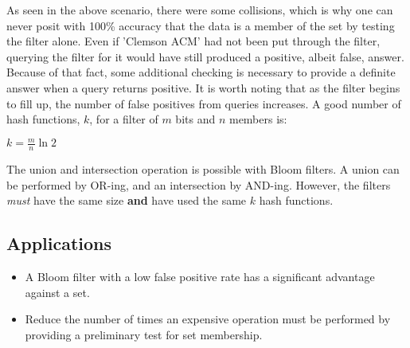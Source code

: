 As seen in the above scenario, there were some collisions, which is why one can never posit with 100\% accuracy that the data is a member of the set by testing the filter alone.
Even if 'Clemson ACM' had not been put through the filter, querying the filter for it would have still produced a positive, albeit false, answer.
Because of that fact, some additional checking is necessary to provide a definite answer when a query returns positive.
It is worth noting that as the filter begins to fill up, the number of false positives from queries increases.
A good number of hash functions, $k$, for a filter of $m$ bits and $n$ members is:

\Large
\begin{center}
	$k = \frac{m}{n}\ln 2$
\end{center}
\normalsize

The union and intersection operation is possible with Bloom filters. A union can be performed by OR-ing, and an intersection by AND-ing.
However, the filters \textit{must} have the same size \textbf{and} have used the same $k$ hash functions.

\subsection{Applications}

\begin{itemize}
	\item A Bloom filter with a low false positive rate has a significant advantage against a set.
	\item Reduce the number of times an expensive operation must be performed by providing a preliminary test for set membership.
\end{itemize}
